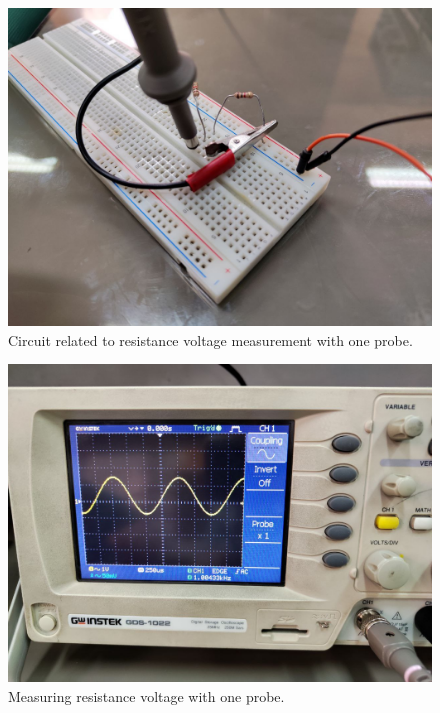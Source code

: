 \documentclass[11pt]{article}
\newcommand{\PicScale}{0.2}
\begin{document}
\begin{question}
{        \begin{figure}[H]
            \begin{center}
                \includegraphics[scale=\PicScale]{Fig/33.jpeg}
                \caption{Circuit related to resistance voltage measurement with one probe.}
            \end{center}
        \end{figure}

        \begin{figure}[H]
            \begin{center}
                \includegraphics[scale=\PicScale]{Fig/34.jpeg}
                \caption{Measuring resistance voltage with one probe.}
            \end{center}
        \end{figure}
    }

\end{question}
\end{document}
